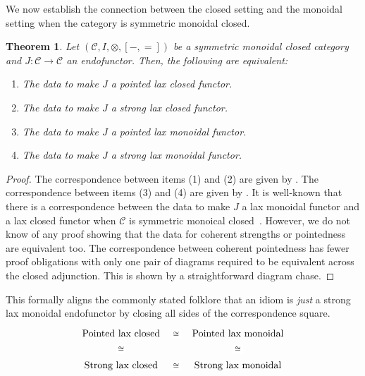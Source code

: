 \documentclass{article}
\newtheorem{thm}{Theorem}
\theoremstyle{definition}
\theoremstyle{remark}
\newcommand{\CCat}{\mathcal{C}}
\begin{document}
We now establish the connection between the closed setting and the monoidal setting when the category is symmetric monoidal closed.

\begin{thm} \label{prop:idiom-corresp}
  Let $(\CCat, I, \otimes, [{-},{=}])$ be a symmetric monoidal closed category and $J: \CCat \to \CCat$ an endofunctor.
  Then, the following are equivalent:
  \begin{enumerate}
    \item The data to make $J$ a pointed lax closed functor.
    \item The data to make $J$ a strong lax closed functor.
    \item The data to make $J$ a pointed lax monoidal functor.
    \item The data to make $J$ a strong lax monoidal functor.
  \end{enumerate}
\end{thm}

\begin{proof}
  The correspondence between items (1) and (2) are given by .
  The correspondence between items (3) and (4) are given by .
  It is well-known that there is a correspondence between the data to make $J$ a lax monoidal functor and a lax closed functor when $\CCat$ is symmetric monoical closed~\cite{kock-strong-functors}.
  However, we do not know of any proof showing that the data for coherent strengths or pointedness are equivalent too.
  The correspondence between coherent pointedness has fewer proof obligations with only one pair of diagrams required to be equivalent across the closed adjunction.
  This is shown by a straightforward diagram chase.
\end{proof}

This formally aligns the commonly stated folklore that an idiom is \emph{just} a strong lax monoidal endofunctor by closing all sides of the correspondence square.
\[
  \begin{tikzcd}
    {\text{Pointed lax closed}} & {\text{Pointed lax monoidal}} \\
    {\text{Strong lax closed}} & {\text{Strong lax monoidal}}
    \arrow["\cong"{description}, draw=none, from=1-1, to=1-2]
    \arrow["\cong"{description}, draw=none, from=1-1, to=2-1]
    \arrow["\cong"{description}, draw=none, from=1-2, to=2-2]
    \arrow["\cong"{description}, draw=none, from=2-1, to=2-2]
  \end{tikzcd}
\]
\end{document}
